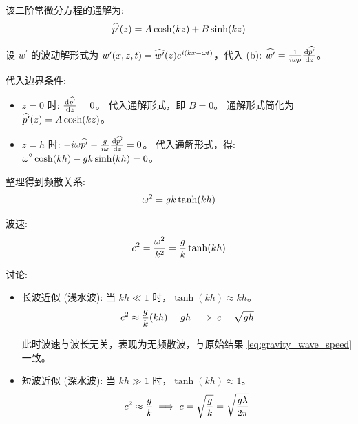 \begin{enumerate}
    该二阶常微分方程的通解为:
    \begin{equation*}
        \widehat{p^\prime}(z) = A \cosh(k z) + B \sinh(k z)
    \end{equation*}

    设 $w^\prime$ 的波动解形式为 $w^\prime(x, z, t) = \widehat{w^\prime}(z) e^{i (k x - \omega t)}$，代入 (b): $\complexamp{w^\prime} = \frac{1}{i \frequency \density} \ode{\complexamp{\pressure^\prime}}{z}$。

    代入边界条件:
    \begin{itemize}
        \item $z = 0$ 时: $\ode{\complexamp{\pressure^\prime}}{z} = 0$。
        代入通解形式，即 $B = 0$。
        通解形式简化为 $\widehat{p^\prime}(z) = A \cosh(k z)$。

        \item $z = h$ 时: $-i \frequency {\complexamp{\pressure^\prime}} - \frac{\gravityconst}{i \frequency} \ode{\complexamp{\pressure^\prime}}{z} = 0$。
        代入通解形式，得: $\omega^2 \cosh(kh) - g k \sinh(kh) = 0$。
    \end{itemize}

    整理得到频散关系:
    \begin{equation*}
        \omega^2 = g k \tanh(kh)
    \end{equation*}

    波速:
    \begin{equation*}
        c^2 = \frac{\omega^2}{k^2} = \frac{g}{k} \tanh(kh)
    \end{equation*}

    讨论:
    \begin{itemize}
        \item 长波近似 (浅水波): 当 $k h \ll 1$ 时，$\tanh(k h) \approx kh$。
        \begin{equation*}
            c^2 \approx \frac{g}{k} (k h) = g h \implies c = \sqrt{g h}
        \end{equation*}

        此时波速与波长无关，表现为无频散波，与原始结果 \eqref{eq:gravity_wave_speed} 一致。

        \item 短波近似 (深水波): 当 $k h \gg 1$ 时，$\tanh(k h) \approx 1$。
        \begin{equation*}
            c^2 \approx \frac{g}{k} \implies c = \sqrt{\frac{g}{k}} = \sqrt{\frac{g \lambda}{2\pi}}
        \end{equation*}


\end{itemize}
\end{enumerate}

